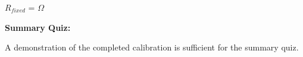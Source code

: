 \vskip 10pt

$R_{fixed}$ =  $\Omega$

\vfil \eject

\noindent
{\bf Summary Quiz:}

A demonstration of the completed calibration is sufficient for the summary quiz.




